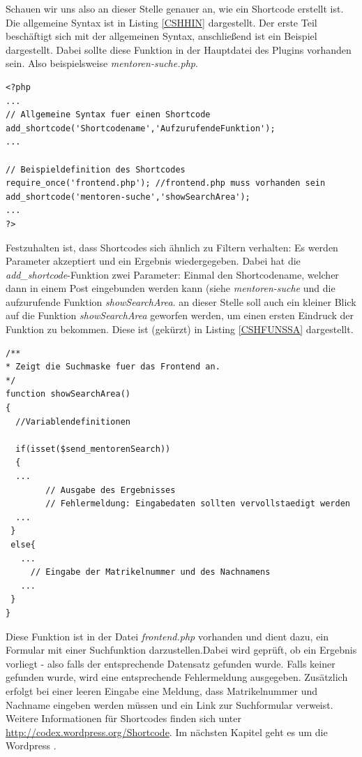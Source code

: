 Schauen wir uns also an dieser Stelle genauer an, wie ein Shortcode erstellt ist. Die allgemeine Syntax ist in Listing \ref{CSHHIN} dargestellt. Der erste Teil beschäftigt sich mit der allgemeinen Syntax, anschließend ist ein Beispiel dargestellt. Dabei sollte diese Funktion in der Hauptdatei des Plugins vorhanden sein. Also beispielsweise \emph{mentoren-suche.php}.
\begin{lstlisting}
<?php
...
// Allgemeine Syntax fuer einen Shortcode
add_shortcode('Shortcodename','AufzurufendeFunktion');
...

// Beispieldefinition des Shortcodes
require_once('frontend.php'); //frontend.php muss vorhanden sein
add_shortcode('mentoren-suche','showSearchArea');
...
?>
\end{lstlisting} 
Festzuhalten ist, dass Shortcodes sich ähnlich zu Filtern verhalten: Es werden Parameter akzeptiert und ein Ergebnis wiedergegeben. Dabei hat die \emph{add\_shortcode}-Funktion zwei Parameter: Einmal den Shortcodename, welcher dann in einem Post eingebunden werden kann (siehe \emph{mentoren-suche} und die aufzurufende Funktion \emph{showSearchArea}. \newline
an dieser Stelle soll auch ein kleiner Blick auf die Funktion \emph{showSearchArea} geworfen werden, um einen ersten Eindruck der Funktion zu bekommen. Diese ist (gekürzt) in Listing \ref{CSHFUNSSA} dargestellt.
\begin{lstlisting}
/**
* Zeigt die Suchmaske fuer das Frontend an.
*/
function showSearchArea()
{ 
  //Variablendefinitionen
  
  if(isset($send_mentorenSearch))
  {
  ...
  		// Ausgabe des Ergebnisses
  		// Fehlermeldung: Eingabedaten sollten vervollstaedigt werden 	
  ... 
 }
 else{
   ...  
     // Eingabe der Matrikelnummer und des Nachnamens
   ...
 }
}
\end{lstlisting} 
Diese Funktion ist in der Datei \emph{frontend.php} vorhanden und dient dazu, ein Formular mit einer Suchfunktion darzustellen.Dabei wird geprüft, ob ein Ergebnis vorliegt - also falls der entsprechende Datensatz gefunden wurde. Falls keiner gefunden wurde, wird eine entsprechende Fehlermeldung ausgegeben. Zusätzlich erfolgt bei einer leeren Eingabe eine Meldung, dass Matrikelnummer und Nachname eingeben werden müssen und ein Link zur Suchformular verweist. Weitere Informationen für Shortcodes finden sich unter \url{http://codex.wordpress.org/Shortcode}. \newline
Im nächsten Kapitel geht es um die Wordpress .
